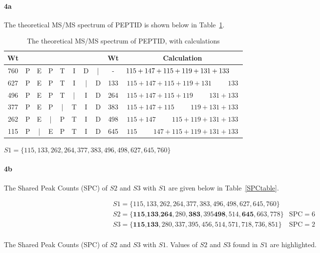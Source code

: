 \documentclass[12pt]{article}
\begin{document}
\paragraph{4a}  The theoretical MS/MS spectrum of PEPTID is shown below in Table~\ref{peptid}.\\
\begin{table}[hb]
\begin{tabular}{ccccccccc|c}
Wt & & & & & & & & Wt&Calculation\\\hline
760 &P&E&P&T&I&D&|&-&$115+147+115+119+131+133\hspace{.5cm}$\\
627 &P&E&P&T&I&|&D&133&$115+147+115+119+131\hspace{1cm}133$\\
496 &P&E&P&T&|&I&D&264&$115+147+115+119\hspace{1cm}131+133$\\
377 &P&E&P&|&T&I&D&383&$115+147+115\hspace{1cm}119+131+133$\\
262 &P&E&|&P&T&I&D&498&$115+147\hspace{1cm}115+119+131+133$\\
115 &P&|&E&P&T&I&D&645&$115\hspace{1cm}147+115+119+131+133$\\
\end{tabular}
\begin{center}
$S1=\{115,133,262,264,377,383,496,498,627,645,760\}$
\end{center}
\caption{The theoretical MS/MS spectrum of PEPTID, with calculations}
\label{peptid}
\end{table}

\paragraph{4b}  The Shared Peak Counts (SPC) of $S2$ and $S3$ with $S1$ are given below in Table~\ref{SPCtable}.
\begin{table}[hbt]
\begin{displaymath}
\begin{array}{ll}
S1=\{115,133,262,264,377,383,496,498,627,645,760\}& \\
S2=\{\textbf{115,133,264},280,\textbf{383}, 395 \textbf{498},514,\textbf{645},663,778\}& \text{SPC}=6\\
S3=\{\textbf{115,133},280, 337,395,456,514,571,718,736,851\}& \text{SPC}=2\\
\end{array}
\end{displaymath}
\caption{The Shared Peak Counts (SPC) of $S2$ and $S3$ with $S1$.  Values of $S2$ and $S3$ found in $S1$ are highlighted.}
\label{SPCtable}
\end{table}
\end{document}
